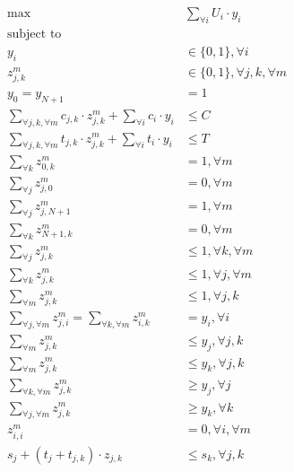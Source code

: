 \begin{align}
	\label{eq:max}
	\max \quad & \sum_{\forall i} U_{{i}} \cdot y_{i} \\
	\text{subject to } \quad & \nonumber \\
	\label{eq:y}
	y_{i} & \in \{ 0, 1 \}, \forall i \\
	\label{eq:z}
	z^m_{j,k} & \in \{ 0, 1 \}, \forall j,k, \forall m \\
	\label{eq:sd}
	y_{0} = y_{{N+1}} & = 1 \\
	\label{eq:cost}
	\sum_{\forall j, k, \forall m} c_{{j},{k}} \cdot z^m_{j,k} + \sum_{\forall i} c_{i} \cdot y_{i} & \leq C \\
	\label{eq:time}
	\sum_{\forall j, k, \forall m} t_{{j},{k}} \cdot z^m_{j,k} + \sum_{\forall i} t_{i} \cdot y_{i} & \leq T \\
	\label{eq:sout}
	\sum_{\forall k} z^m_{{0},{k}} & = 1, \forall m \\
	\label{eq:sin}
	\sum_{\forall j} z^m_{{j},{0}} & = 0, \forall m \\
	\label{eq:din}
	\sum_{\forall j} z^m_{{j},{N+1}} & = 1, \forall m \\
	\label{eq:dout}
	\sum_{\forall k} z^m_{{N+1},{k}} & = 0, \forall m \\
	\label{eq:out}
	\sum_{\forall j} z^m_{{j},{k}} & \leq 1, \forall k, \forall m \\
	\label{eq:in}
	\sum_{\forall k} z^m_{{j},{k}} & \leq 1, \forall j, \forall m \\
	\label{eq:mode}
	\sum_{\forall m} z^m_{{j},{k}} & \leq 1, \forall j, k \\
	\label{eq:connectivity}
	\sum_{\forall j, \forall m} z^m_{{j},{i}} = \sum_{\forall k, \forall m} z^m_{{i},{k}} & = y_i, \forall i \\
	\label{eq:nodechosen1}
	\sum_{\forall m} z^m_{{j},{k}} & \leq y_j, \forall j,k \\
	\label{eq:nodechosen2}
	\sum_{\forall m} z^m_{{j},{k}} & \leq y_k, \forall j,k \\
	\label{eq:edgechosen1}
	\sum_{\forall k, \forall m} z^m_{{j},{k}} & \geq y_j, \forall j \\
	\label{eq:edgechosen2}
    \sum_{\forall j, \forall m} z^m_{{j},{k}} & \geq y_k, \forall k \\
	\label{eq:self}
	z^m_{{i},{i}} & = 0, \forall i, \forall m  \\
	\label{eq:subtour}
	s_j + (t_{j} + t_{j,k}) \cdot z_{j,k} & \leq s_k, \forall j,k
\end{align}

